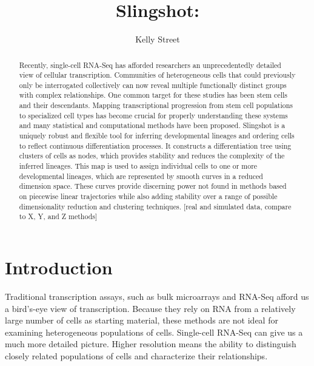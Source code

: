\documentclass[11pt]{article}\usepackage[]{graphicx}\usepackage[]{color}
\title{Slingshot: }
\author{Kelly Street}
\date{}
\begin{document}
\maketitle

\begin{abstract}
  
Recently, single-cell RNA-Seq has afforded researchers an unprecedentedly detailed view of cellular transcription. Communities of heterogeneous cells that could previously only be interrogated collectively can now reveal multiple functionally distinct groups with complex relationships. One common target for these studies has been stem cells and their descendants. Mapping transcriptional progression from stem cell populations to specialized cell types has become crucial for properly understanding these systems and many statistical and computational methods have been proposed. Slingshot is a uniquely robust and flexible tool for inferring developmental lineages and ordering cells to reflect continuous differentiation processes. It constructs a differentiation tree using clusters of cells as nodes, which provides stability and reduces the complexity of the inferred lineages. This map is used to assign individual cells to one or more developmental lineages, which are represented by smooth curves in a reduced dimension space. These curves provide discerning power not found in methods based on piecewise linear trajectories while also adding stability over a range of possible dimensionality reduction and clustering techniques. [real and simulated data, compare to X, Y, and Z methods]

\end{abstract}

\section{Introduction}

Traditional transcription assays, such as bulk microarrays and RNA-Seq afford us a bird's-eye view of transcription. Because they rely on RNA from a relatively large number of cells as starting material, these methods are not ideal for examining heterogeneous populations of cells. Single-cell RNA-Seq can give us a much more detailed picture. Higher resolution means the ability to distinguish closely related populations of cells and characterize their relationships.
\end{document}
